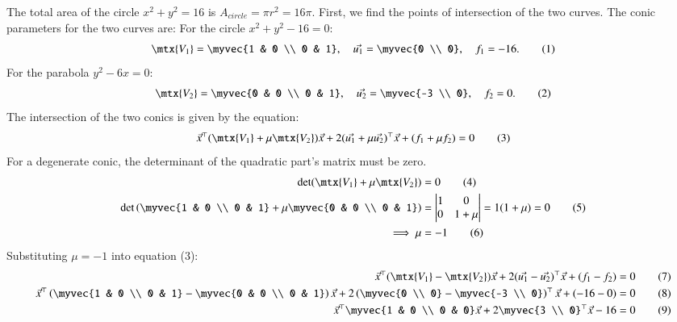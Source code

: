 \documentclass[journal]{IEEEtran}
\begin{document}
\solution
The total area of the circle $x^2 + y^2 = 16$ is $A_{circle} = \pi r^2 = 16\pi$.
First, we find the points of intersection of the two curves.
The conic parameters for the two curves are:
For the circle $x^2 + y^2 - 16 = 0$:
\begin{align}
\mtx{V_1} = \myvec{1 & 0 \\ 0 & 1}, \quad \vec{u_1} = \myvec{0 \\ 0}, \quad f_1 = -16. \tag{1}
\end{align}
For the parabola $y^2 - 6x = 0$:
\begin{align}
\mtx{V_2} = \myvec{0 & 0 \\ 0 & 1}, \quad \vec{u_2} = \myvec{-3 \\ 0}, \quad f_2 = 0. \tag{2}
\end{align}
The intersection of the two conics is given by the equation:
\begin{equation}
	\vec{x}^\top(\mtx{V_1} + \mu\mtx{V_2})\vec{x} + 2(\vec{u_1} + \mu\vec{u_2})^\top\vec{x} + (f_1 + \mu f_2) = 0 \tag{3}
\end{equation}
For a degenerate conic, the determinant of the quadratic part's matrix must be zero.
\begin{align}
\det(\mtx{V_1} + \mu\mtx{V_2}) &= 0 \tag{4} \\
\det\left(\myvec{1 & 0 \\ 0 & 1} + \mu\myvec{0 & 0 \\ 0 & 1}\right) &=
\begin{vmatrix}
	1 & 0 \\
	0 & 1+\mu
\end{vmatrix}
 = 1(1+\mu) = 0 \tag{5} \\
\implies \mu &= -1 \tag{6}
\end{align}
Substituting $\mu = -1$ into equation (3):
\begin{align} 
\vec{x}^\top( \mtx{V_1} - \mtx{V_2} )\vec{x} + 2( \vec{u_1} - \vec{u_2} )^\top\vec{x} + ( f_1 - f_2 ) &= 0 \tag{7} \\
\vec{x}^\top\left( \myvec{1 & 0 \\ 0 & 1} - \myvec{0 & 0 \\ 0 & 1} \right)\vec{x} + 2\left( \myvec{0 \\ 0} - \myvec{-3 \\ 0} \right)^\top\vec{x} + ( -16 - 0 ) &= 0 \tag{8} \\
\vec{x}^\top \myvec{1 & 0 \\ 0 & 0} \vec{x} + 2 \myvec{3 \\ 0}^\top \vec{x} - 16 &= 0 \tag{9}
\end{align}
\end{document}
